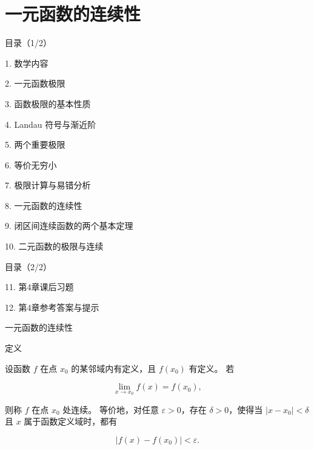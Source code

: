 \documentclass[aspectratio=169,10pt,fontset=fandol]{ctexbeamer}
\begin{document}
\section{一元函数的连续性}
\begin{frame}[t,fragile]{目录（1/2）}
\normalsize
{\color{black}\normalsize 1. 数学内容\par}\vspace{0.3em}
{\color{black}\normalsize 2. 一元函数极限\par}\vspace{0.3em}
{\color{black}\normalsize 3. 函数极限的基本性质\par}\vspace{0.3em}
{\color{black}\normalsize 4. Landau 符号与渐近阶\par}\vspace{0.3em}
{\color{black}\normalsize 5. 两个重要极限\par}\vspace{0.3em}
{\color{black}\normalsize 6. 等价无穷小\par}\vspace{0.3em}
{\color{black}\normalsize 7. 极限计算与易错分析\par}\vspace{0.3em}
{\color{blue}\normalsize 8. 一元函数的连续性\par}\vspace{0.3em}
{\color{gray!40}\normalsize 9. 闭区间连续函数的两个基本定理\par}\vspace{0.3em}
{\color{gray!40}\normalsize 10. 二元函数的极限与连续\par}\vspace{0.3em}
\end{frame}
\begin{frame}[t,fragile]{目录（2/2）}
\normalsize
{\color{gray!40}\normalsize 11. 第4章课后习题\par}\vspace{0.3em}
{\color{gray!40}\normalsize 12. 第4章参考答案与提示\par}\vspace{0.3em}
\end{frame}
\begin{frame}[t,fragile]{一元函数的连续性}
\normalsize
\begin{block}{定义}
{\normalsize


设函数 $f$ 在点 $x_0$ 的某邻域内有定义，且 $f(x_0)$ 有定义。 若

\[

\lim_{x\to x_0}f(x)=f(x_0),

\]

则称 $f$ 在点 $x_0$ 处连续。 等价地，对任意 $\varepsilon>0$，存在 $\delta>0$，使得当 $|x-x_0|<\delta$ 且 $x$ 属于函数定义域时，都有

\[

|f(x)-f(x_0)|<\varepsilon.

\]


}
\end{block}
\end{frame}
\end{document}
